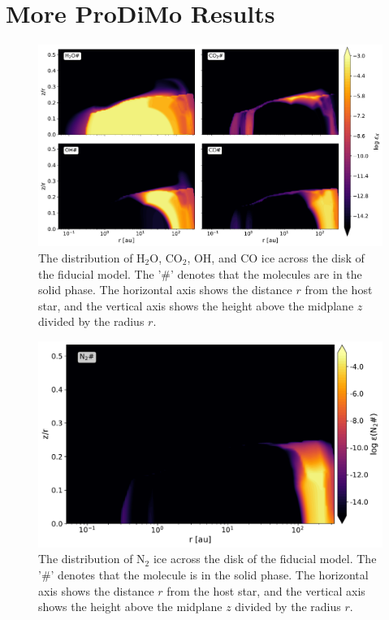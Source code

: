 \documentclass[oneside, single, authoryear, semicolon, 12pt]{lion-msc}
\newcommand{\4}{$_4$}
\newcommand{\3}{$_3$}
\newcommand{\2}{$_2$}
\begin{document}
\appendix
\chapter{More ProDiMo Results}
\begin{figure}
    \centering
    \includegraphics[width=\linewidth]{Figures/Abundance1ice.pdf}
    \caption{The distribution of H\2O, CO\2, OH, and CO ice across the disk of the fiducial model. The '#' denotes that the molecules are in the solid phase. The horizontal axis shows the distance $r$ from the host star, and the vertical axis shows the height above the midplane $z$ divided by the radius $r$.}
    \label{fig:enter-label}
\end{figure}
\begin{figure}
    \centering
    \includegraphics[width=\linewidth]{Figures/AbundanceN2ice.pdf}
    \caption{The distribution of N\2 ice across the disk of the fiducial model. The '#' denotes that the molecule is in the solid phase. The horizontal axis shows the distance $r$ from the host star, and the vertical axis shows the height above the midplane $z$ divided by the radius $r$.}
    \label{fig:enter-label}
\end{figure}
\end{document}
